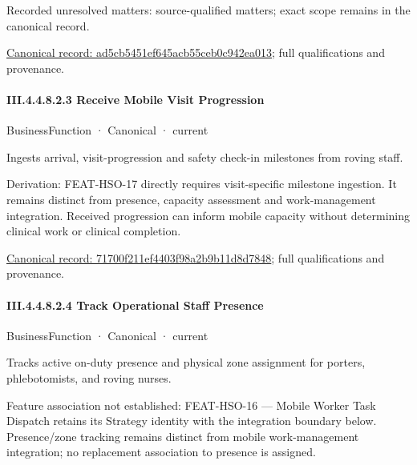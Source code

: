 {\small Recorded unresolved matters: source-qualified matters; exact scope remains in the canonical record.}\par
{\footnotesize \href{../../../../continuum/business/business-function/ad5cb5451ef645acb55ceb0c942ea013.md}{Canonical record: ad5cb5451ef645acb55ceb0c942ea013}; full qualifications and provenance.}\par
\paragraph*{III.4.4.8.2.3 Receive Mobile Visit Progression}
\label{navigation:III.4.4.8.2.3}

\label{element:71700f211ef4403f98a2b9b11d8d7848}
{\small BusinessFunction · Canonical · current}\par

Ingests arrival, visit-progression and safety check-in milestones from roving staff.



Derivation: FEAT-HSO-17 directly requires visit-specific milestone ingestion. It remains distinct from presence, capacity assessment and work-management integration. Received progression can inform mobile capacity without determining clinical work or clinical completion.


{\footnotesize \href{../../../../continuum/business/business-function/71700f211ef4403f98a2b9b11d8d7848.md}{Canonical record: 71700f211ef4403f98a2b9b11d8d7848}; full qualifications and provenance.}\par
\paragraph*{III.4.4.8.2.4 Track Operational Staff Presence}
\label{navigation:III.4.4.8.2.4}

\label{element:9ccdb235a69946e0ad5a99001a1d16e0}
{\small BusinessFunction · Canonical · current}\par

Tracks active on-duty presence and physical zone assignment for porters, phlebotomists, and roving nurses.



Feature association not established: FEAT-HSO-16 — Mobile Worker Task Dispatch retains its Strategy identity with the integration boundary below. Presence/zone tracking remains distinct from mobile work-management integration; no replacement association to presence is assigned.


